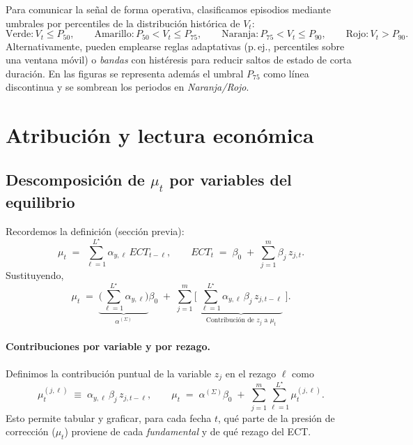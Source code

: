 \documentclass[11pt,a4paper]{article}
\newcommand{\1}{\mathbf{1}}
\begin{document}
Para comunicar la señal de forma operativa, clasificamos episodios mediante umbrales por percentiles de la distribución histórica de $V_t$:
\[
\text{Verde}: V_t \le P_{50},\qquad
\text{Amarillo}: P_{50} < V_t \le P_{75},\qquad
\text{Naranja}: P_{75} < V_t \le P_{90},\qquad
\text{Rojo}: V_t > P_{90}.
\]
Alternativamente, pueden emplearse reglas adaptativas (p.\,ej., percentiles sobre una ventana móvil) o \emph{bandas} con histéresis para reducir saltos de estado de corta duración. 
En las figuras se representa además el umbral $P_{75}$ como línea discontinua y se sombrean los periodos en \emph{Naranja/Rojo}.

\section{Atribución y lectura económica}

\subsection{Descomposición de \texorpdfstring{$\mu_t$}{mu\_t} por variables del equilibrio}

Recordemos la definición (sección previa):
\[
\mu_t \;=\; \sum_{\ell=1}^{L^\star} \alpha_{y,\ell}\, ECT_{t-\ell},
\qquad
ECT_t \;=\; \beta_0 \;+\; \sum_{j=1}^{m} \beta_j\, z_{j,t}.
\]
Sustituyendo,
\begin{equation}
\label{eq:mu_decomp}
\mu_t
\;=\;
\underbrace{\Big(\sum_{\ell=1}^{L^\star} \alpha_{y,\ell}\Big)}_{\displaystyle \alpha^{(\Sigma)}}
\beta_0
\;+\;
\sum_{j=1}^{m}
\Bigg[\;
\underbrace{\sum_{\ell=1}^{L^\star} \alpha_{y,\ell}\, \beta_j\, z_{j,t-\ell}}_{\displaystyle \text{Contribución de } z_j \text{ a } \mu_t}
\;\Bigg].
\end{equation}

\paragraph{Contribuciones por variable y por rezago.}
Definimos la contribución puntual de la variable \(z_j\) en el rezago \(\ell\) como
\[
\mu_{t}^{(j,\ell)} \;\equiv\; \alpha_{y,\ell}\, \beta_j\, z_{j,t-\ell},
\qquad
\mu_t \;=\; \alpha^{(\Sigma)}\beta_0 \;+\; \sum_{j=1}^{m}\sum_{\ell=1}^{L^\star} \mu_t^{(j,\ell)}.
\]
Esto permite tabular y graficar, para cada fecha \(t\), qué parte de la presión de corrección (\(\mu_t\)) proviene de cada \emph{fundamental} y de qué rezago del ECT.
\end{document}
